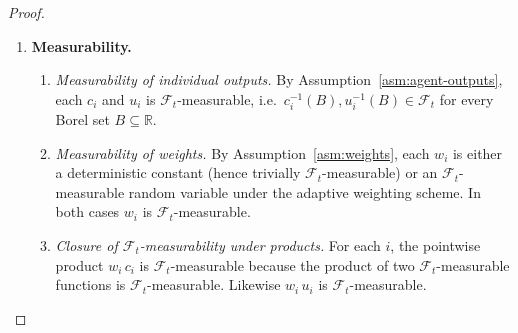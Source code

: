 \documentclass[12pt,openany]{book}
\newcommand{\calF}{\mathcal{F}}
\newcommand{\Prob}{\mathbb{P}}
\numberwithin{equation}{chapter}
\theoremstyle{plain}
\theoremstyle{definition}
\theoremstyle{remark}
\numberwithin{equation}{chapter}
\theoremstyle{plain}
\begin{document}
\begin{proof}
\begin{enumerate}
\begin{enumerate}
    \item \emph{Upper bound for $C$.}
      Since $c_i \leq 1$ and $w_i \geq 0$:
      \begin{align}
        \sum_{i=1}^{n} w_i\, c_i
          &\;\leq\;
           \sum_{i=1}^{n} w_i \cdot 1
           \;=\; W,
      \end{align}
      and therefore $C = \bigl(\sum_i w_i c_i\bigr)/W \leq 1$.

    \item \emph{Combining bounds for $C$.}
      \begin{align}
        0
          &\;\leq\;
           C
           \;=\;
           \frac{\sum_{i=1}^{n} w_i\, c_i}{W}
           \;\leq\; 1,
           \quad \Prob\text{-a.s.}
      \end{align}

    \item \emph{Identical argument for $U$.}
      Replacing $c_i$ by $u_i$ in steps (b)--(d) above
      yields, by the same chain of inequalities:
      \begin{align}
        0
          &\;\leq\;
           U
           \;=\;
           \frac{\sum_{i=1}^{n} w_i\, u_i}{W}
           \;\leq\; 1,
           \quad \Prob\text{-a.s.}
      \end{align}
  \end{enumerate}

  \item \textbf{Measurability.}

  \begin{enumerate}
    \item \emph{Measurability of individual outputs.}
      By Assumption~\ref{asm:agent-outputs}, each $c_i$ and
      $u_i$ is $\calF_t$-measurable, i.e.\
      $c_i^{-1}(B), u_i^{-1}(B) \in \calF_t$ for every
      Borel set $B \subseteq \mathbb{R}$.

    \item \emph{Measurability of weights.}
      By Assumption~\ref{asm:weights}, each $w_i$ is either
      a deterministic constant (hence trivially
      $\calF_t$-measurable) or an $\calF_t$-measurable
      random variable under the adaptive weighting scheme.
      In both cases $w_i$ is $\calF_t$-measurable.

    \item \emph{Closure of $\calF_t$-measurability under
      products.}
      For each $i$, the pointwise product $w_i\, c_i$ is
      $\calF_t$-measurable because the product of two
      $\calF_t$-measurable functions is
      $\calF_t$-measurable.  Likewise $w_i\, u_i$ is
      $\calF_t$-measurable.


\end{enumerate}
\end{enumerate}
\end{proof}
\end{document}
